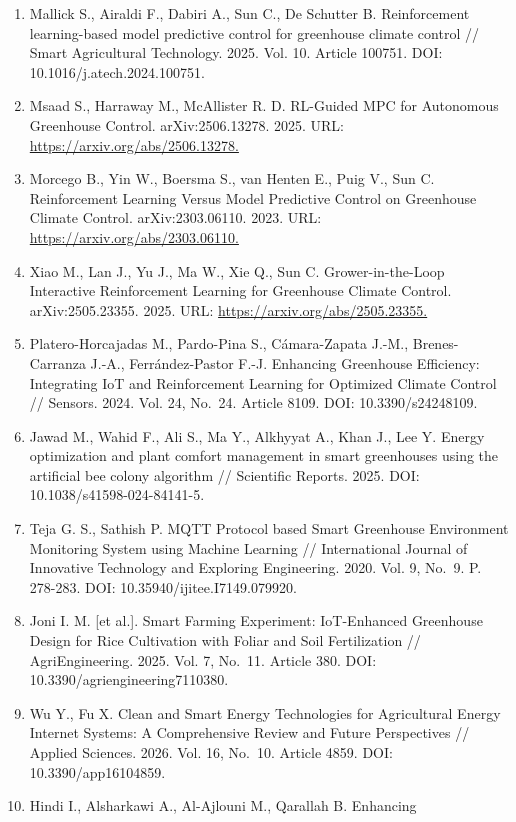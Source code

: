 \documentclass[a4paper,14pt]{extarticle}
\begin{document}
\begin{enumerate}
\item
  Mallick S., Airaldi F., Dabiri A., Sun C., De Schutter B.
  Reinforcement learning-based model predictive control for greenhouse
  climate control // Smart Agricultural Technology. 2025. Vol. 10.
  Article 100751. DOI: 10.1016/j.atech.2024.100751.
\item
  Msaad S., Harraway M., McAllister R. D. RL-Guided MPC for Autonomous
  Greenhouse Control. arXiv:2506.13278. 2025. URL:
  \url{https://arxiv.org/abs/2506.13278.}
\item
  Morcego B., Yin W., Boersma S., van Henten E., Puig V., Sun C.
  Reinforcement Learning Versus Model Predictive Control on Greenhouse
  Climate Control. arXiv:2303.06110. 2023. URL:
  \url{https://arxiv.org/abs/2303.06110.}
\item
  Xiao M., Lan J., Yu J., Ma W., Xie Q., Sun C. Grower-in-the-Loop
  Interactive Reinforcement Learning for Greenhouse Climate Control.
  arXiv:2505.23355. 2025. URL: \url{https://arxiv.org/abs/2505.23355.}
\item
  Platero-Horcajadas M., Pardo-Pina S., Cámara-Zapata J.-M.,
  Brenes-Carranza J.-A., Ferrández-Pastor F.-J. Enhancing Greenhouse
  Efficiency: Integrating IoT and Reinforcement Learning for Optimized
  Climate Control // Sensors. 2024. Vol. 24, No.~24. Article 8109. DOI:
  10.3390/s24248109.
\item
  Jawad M., Wahid F., Ali S., Ma Y., Alkhyyat A., Khan J., Lee Y. Energy
  optimization and plant comfort management in smart greenhouses using
  the artificial bee colony algorithm // Scientific Reports. 2025. DOI:
  10.1038/s41598-024-84141-5.
\item
  Teja G. S., Sathish P. MQTT Protocol based Smart Greenhouse
  Environment Monitoring System using Machine Learning // International
  Journal of Innovative Technology and Exploring Engineering. 2020. Vol.
  9, No.~9. P. 278-283. DOI: 10.35940/ijitee.I7149.079920.
\item
  Joni I. M. {[}et al.{]}. Smart Farming Experiment: IoT-Enhanced
  Greenhouse Design for Rice Cultivation with Foliar and Soil
  Fertilization // AgriEngineering. 2025. Vol. 7, No.~11. Article 380.
  DOI: 10.3390/agriengineering7110380.
\item
  Wu Y., Fu X. Clean and Smart Energy Technologies for Agricultural
  Energy Internet Systems: A Comprehensive Review and Future
  Perspectives // Applied Sciences. 2026. Vol. 16, No.~10. Article 4859.
  DOI: 10.3390/app16104859.
\item
  Hindi I., Alsharkawi A., Al-Ajlouni M., Qarallah B. Enhancing

\end{enumerate}
\end{document}
